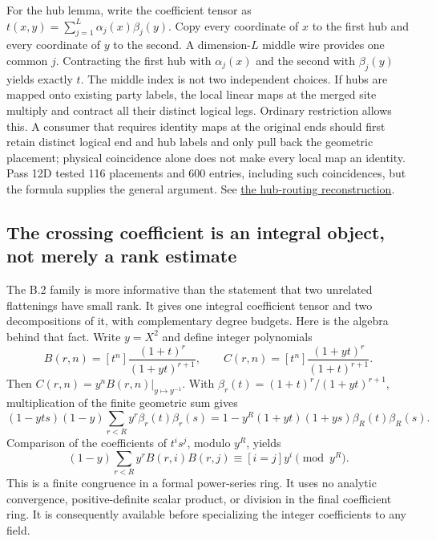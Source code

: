 \documentclass[11pt,letterpaper]{article}
\theoremstyle{definition}\newtheorem{definition}[theorem]{Definition}\newtheorem{example}[theorem]{Example}
\theoremstyle{remark}\newtheorem{remark}[theorem]{Remark}
\newcommand{\aud}[2]{\href{https://github.com/nousentllc/VP-VNP-Review/blob/567303d0bcf4f9d54390437b137752446e58ccd6/#1}{#2}}
\begin{document}
For the hub lemma, write the coefficient tensor as $t(x,y)=\sum_{j=1}^{L}\alpha_j(x)\beta_j(y)$. Copy every coordinate of $x$ to the first hub and every coordinate of $y$ to the second. A dimension-$L$ middle wire provides one common $j$. Contracting the first hub with $\alpha_j(x)$ and the second with $\beta_j(y)$ yields exactly $t$. The middle index is not two independent choices. If hubs are mapped onto existing party labels, the local linear maps at the merged site multiply and contract all their distinct logical legs. Ordinary restriction allows this. A consumer that requires identity maps at the original ends should first retain distinct logical end and hub labels and only pull back the geometric placement; physical coincidence alone does not make every local map an identity. Pass 12D tested 116 placements and 600 entries, including such coincidences, but the formula supplies the general argument. See \aud{passes/12d-hub-routing.md}{the hub-routing reconstruction}.

\subsection{The crossing coefficient is an integral object, not merely a rank estimate}\label{sec:crossdetail}
The B.2 family is more informative than the statement that two unrelated flattenings have small rank. It gives one integral coefficient tensor and two decompositions of it, with complementary degree budgets. Here is the algebra behind that fact. Write $y=X^2$ and define integer polynomials
\[
 B(r,n)=[t^n]\frac{(1+t)^r}{(1+yt)^{r+1}},\qquad
 C(r,n)=[t^n]\frac{(1+yt)^r}{(1+t)^{r+1}}.
\]
Then $C(r,n)=y^n B(r,n)|_{y\mapsto y^{-1}}$. With $\beta_r(t)=(1+t)^r/(1+yt)^{r+1}$, multiplication of the finite geometric sum gives
\[
 (1-yts)(1-y)\sum_{r<R}y^r\beta_r(t)\beta_r(s)
 =1-y^R(1+yt)(1+ys)\beta_R(t)\beta_R(s).
\]
Comparison of the coefficients of $t^i s^j$, modulo $y^R$, yields
\[
 (1-y)\sum_{r<R}y^rB(r,i)B(r,j)\equiv [i=j]y^i\pmod {y^R}.
\]
This is a finite congruence in a formal power-series ring. It uses no analytic convergence, positive-definite scalar product, or division in the final coefficient ring. It is consequently available before specializing the integer coefficients to any field.
\end{document}
